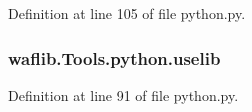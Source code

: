 Definition at line 105 of file python.\+py.

\subsubsection[{\texorpdfstring{uselib}{uselib}}]{\setlength{\rightskip}{0pt plus 5cm}waflib.\+Tools.\+python.\+uselib}\hypertarget{namespacewaflib_1_1_tools_1_1python_ac0ae18ba0bcaa4710625045771b2a442}{}\label{namespacewaflib_1_1_tools_1_1python_ac0ae18ba0bcaa4710625045771b2a442}


Definition at line 91 of file python.\+py.

